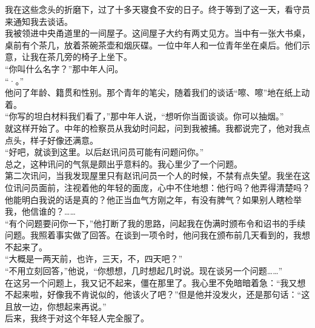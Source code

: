 我在这些念头的折磨下，过了十多天寝食不安的日子。终于等到了这一天，看守员来通知我去谈话。\\

我被领进中央甬道里的一间屋子。这间屋子大约有两丈见方。当中有一张大书桌，桌前有个茶几，放着茶碗茶壶和烟灰碟。一位中年人和一位青年坐在桌后。他们示意，让我在茶几旁的椅子上坐下。\\

“你叫什么名字？”那中年人问。\\

“·。”\\

他问了年龄、籍贯和性别。那个青年的笔尖，随着我们的谈话“嚓、嚓”地在纸上动着。\\

“你写的坦白材料我们看了，”那中年人说，“想听你当面谈谈。你可以抽烟。”\\

就这样开始了。中年的检察员从我幼时问起，问到我被捕。我都说完了，他对我点点头，样子好像还满意。\\

“好吧，就谈到这里。以后赵讯问员可能有问题问你。”\\

总之，这种讯问的气氛是颇出乎意料的。我心里少了一个问题。\\

第二次讯问，当我发现屋里只有赵讯问员一个人的时候，不禁有点失望。我坐在这位讯问员面前，注视着他的年轻的面庞，心中不住地想：他行吗？他弄得清楚吗？他能明白我说的话是真的？他正当血气方刚之年，有没有脾气？如果别人瞎检举我，他信谁的？……\\

“有个问题要问你一下，”他打断了我的思路，问起我在伪满时颁布令和诏书的手续问题。我照着事实做了回答。在谈到一项令时，他问我在颁布前几天看到的，我想不起来了。\\

“大概是一两天前，也许，三天，不，四天吧？”\\

“不用立刻回答，”他说，“你想想，几时想起几时说。现在谈另一个问题……”\\

在这另一个问题上，我又记不起来，僵在那里了。我心里不免暗暗着急：“我又想不起来啦，好像我不肯说似的，他该火了吧？”但是他并没发火，还是那句话：“这且放一边，你想起来再说。”\\

后来，我终于对这个年轻人完全服了。\\

